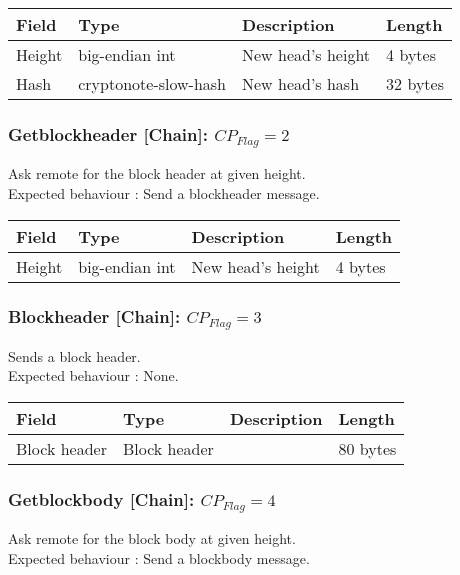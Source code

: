 \documentclass[a4paper,10pt]{article}
\begin{document}
                \noindent\begin{tabularx}{\textwidth}{|l|l|X|l|}
                    \hline Field & Type & Description & Length \\ \hline
                    \hline Height & big-endian int & New head's height & 4 bytes \\
                    \hline Hash & cryptonote-slow-hash & New head's hash & 32 bytes\\
                    \hline
                \end{tabularx}

            \subsubsection{Getblockheader [Chain]: $CP_{Flag} = 2$}
                Ask remote for the block header at given height.\\
                Expected behaviour : Send a blockheader message.\\
                
                \noindent\begin{tabularx}{\textwidth}{|l|l|X|l|}
                    \hline Field & Type & Description & Length \\ \hline
                    \hline Height & big-endian int & New head's height & 4 bytes \\
                    \hline
                \end{tabularx}
            
            \subsubsection{Blockheader [Chain]: $CP_{Flag} = 3$}
                Sends a block header.\\
                Expected behaviour : None.\\
                
                \noindent\begin{tabularx}{\textwidth}{|l|l|X|l|}
                    \hline Field & Type & Description & Length \\ \hline
                    \hline Block header & Block header &  & 80 bytes \\
                    \hline
                \end{tabularx}

            \subsubsection{Getblockbody [Chain]: $CP_{Flag} = 4$}
                Ask remote for the block body at given height.\\
                Expected behaviour : Send a blockbody message.\\
                
\end{document}
